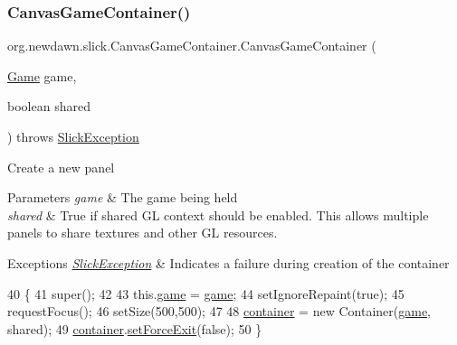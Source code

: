\subsubsection{\texorpdfstring{Canvas\+Game\+Container()}{CanvasGameContainer()}\hspace{0.1cm}{\footnotesize\ttfamily [2/2]}}
{\footnotesize\ttfamily org.\+newdawn.\+slick.\+Canvas\+Game\+Container.\+Canvas\+Game\+Container (\begin{DoxyParamCaption}\item[{\mbox{\hyperlink{interfaceorg_1_1newdawn_1_1slick_1_1_game}{Game}}}]{game,  }\item[{boolean}]{shared }\end{DoxyParamCaption}) throws \mbox{\hyperlink{classorg_1_1newdawn_1_1slick_1_1_slick_exception}{Slick\+Exception}}\hspace{0.3cm}{\ttfamily [inline]}}

Create a new panel


\begin{DoxyParams}{Parameters}
{\em game} & The game being held \\
\hline
{\em shared} & True if shared GL context should be enabled. This allows multiple panels to share textures and other GL resources. \\
\hline
\end{DoxyParams}

\begin{DoxyExceptions}{Exceptions}
{\em \mbox{\hyperlink{classorg_1_1newdawn_1_1slick_1_1_slick_exception}{Slick\+Exception}}} & Indicates a failure during creation of the container \\
\hline
\end{DoxyExceptions}

\begin{DoxyCode}
40                                                                                 \{
41         super();
42 
43         this.\mbox{\hyperlink{classorg_1_1newdawn_1_1slick_1_1_canvas_game_container_aea0c3147fede8b9e57819fbee5c50612}{game}} = \mbox{\hyperlink{classorg_1_1newdawn_1_1slick_1_1_canvas_game_container_aea0c3147fede8b9e57819fbee5c50612}{game}};
44         setIgnoreRepaint(\textcolor{keyword}{true});
45         requestFocus();
46         setSize(500,500);
47         
48         \mbox{\hyperlink{classorg_1_1newdawn_1_1slick_1_1_canvas_game_container_af13c765d7302dc5948d0261e2526ef8b}{container}} = \textcolor{keyword}{new} Container(\mbox{\hyperlink{classorg_1_1newdawn_1_1slick_1_1_canvas_game_container_aea0c3147fede8b9e57819fbee5c50612}{game}}, shared);
49         \mbox{\hyperlink{classorg_1_1newdawn_1_1slick_1_1_canvas_game_container_af13c765d7302dc5948d0261e2526ef8b}{container}}.\mbox{\hyperlink{classorg_1_1newdawn_1_1slick_1_1_game_container_af7539008df0bf3bb0e11a16173abe524}{setForceExit}}(\textcolor{keyword}{false});
50     \}
\end{DoxyCode}


